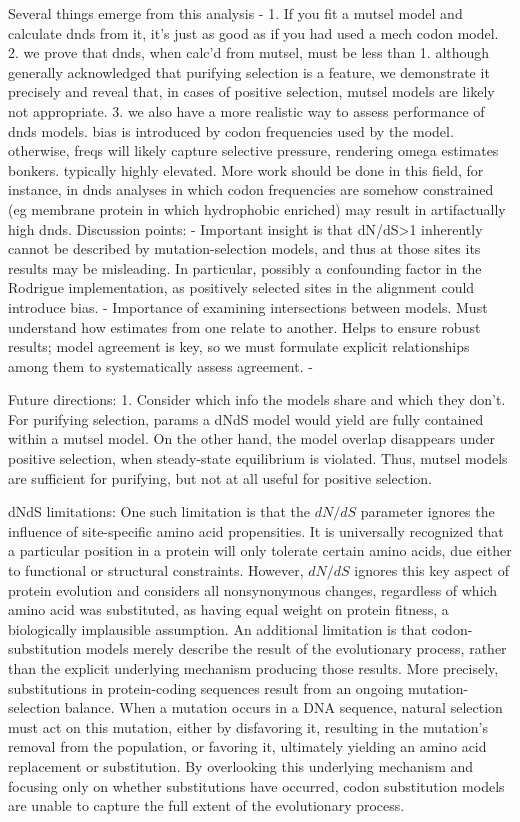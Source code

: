 \documentclass[11pt]{article}
\begin{document}
	
 Several things emerge from this analysis - 
1. If you fit a mutsel model and calculate dnds from it, it's just as good as if you had used a mech codon model. 
2. we prove that dnds, when calc'd from mutsel, must be less than 1. although generally acknowledged that purifying selection is a feature, we demonstrate it precisely and reveal that, in cases of positive selection, mutsel models are likely not appropriate.
3. we also have a more realistic way to assess performance of dnds models. bias is introduced by codon frequencies used by the model. otherwise, freqs will likely capture selective pressure, rendering omega estimates bonkers. typically highly elevated. More work should be done in this field, for instance, in dnds analyses in which codon frequencies are somehow constrained (eg membrane protein in which hydrophobic enriched) may result in artifactually high dnds.
Discussion points:
- Important insight is that dN/dS>1 inherently cannot be described by mutation-selection models, and thus at those sites its results may be misleading. In particular, possibly a confounding factor in the Rodrigue implementation, as positively selected sites in the alignment could introduce bias.
- Importance of examining intersections between models. Must understand how estimates from one relate to another. Helps to ensure robust results; model agreement is key, so we must formulate explicit relationships among them to systematically assess agreement.
- 

	
	

Future directions:
1. Consider which info the models share and which they don't. For purifying selection, params a dNdS model would yield are fully contained within a mutsel model. On the other hand, the model overlap disappears under positive selection, when steady-state equilibrium is violated. Thus, mutsel models are sufficient for purifying, but not at all useful for positive selection.

dNdS limitations:
One such limitation is that the $dN/dS$ parameter ignores the influence of site-specific amino acid propensities.  It is universally recognized that a particular position in a protein will only tolerate certain amino acids, due either to functional or structural constraints. However, $dN/dS$ ignores this key aspect of protein evolution and considers all nonsynonymous changes, regardless of which amino acid was substituted, as having equal weight on protein fitness, a biologically implausible assumption. An additional limitation is that codon-substitution models merely describe the result of the evolutionary process, rather than the explicit underlying mechanism producing those results. More precisely, substitutions in protein-coding sequences result from an ongoing mutation-selection balance. When a mutation occurs in a DNA sequence, natural selection must act on this mutation, either by disfavoring it, resulting in the mutation's removal from the population, or favoring it, ultimately yielding an amino acid replacement or substitution. By overlooking this underlying mechanism and focusing only on whether substitutions have occurred, codon substitution models are unable to capture the full extent of the evolutionary process. 
\end{document}
